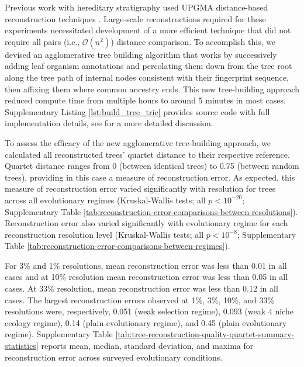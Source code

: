 Previous work with hereditary stratigraphy used UPGMA distance-based reconstruction techniques \citep{moreno2022hereditary}.
Large-scale reconstructions required for these experiments necessitated development of a more efficient technique that did not require all pairs (i.e., $\mathcal{O}(n^2)$) distance comparison.
To accomplish this, we devised an agglomerative tree building algorithm that works by successively adding leaf organism annotations and percolating them down from the tree root along the tree path of internal nodes consistent with their fingerprint sequence, then affixing them where common ancestry ends.
This new tree-building approach reduced compute time from multiple hours to around 5 minutes in most cases.
Supplementary Listing \ref{lst:build_tree_trie} provides source code with full implementation details, see \citep{moreno2024analysis} for a more detailed discussion.



To assess the efficacy of the new agglomerative tree-building approach, we calculated all reconstructed trees' quartet distance to their respective reference.
Quartet distance ranges from 0 (between identical trees) to 0.75 (between random trees), providing in this case a measure of reconstruction error.
As expected, this measure of reconstruction error varied significantly with resolution for trees across all evolutionary regimes (Kruskal-Wallis tests; all $p < 10^{-20}$; Supplementary Table \ref{tab:reconstruction-error-comparisons-between-resolutions}).
Reconstruction error also varied significantly with evolutionary regime for each reconstruction resolution level (Kruskal-Wallis tests; all $p < 10^{-8}$; Supplementary Table \ref{tab:reconstruction-error-comparisons-between-regimes}).

For 3\% and 1\% resolutions, mean reconstruction error was less than 0.01 in all cases and at 10\% resolution mean reconstruction error was less than 0.05 in all cases.
At 33\% resolution, mean reconstruction error was less than 0.12 in all cases.
The largest reconstruction errors observed at 1\%, 3\%, 10\%, and 33\% resolutions were, respectively, 0.051 (weak selection regime), 0.093 (weak 4 niche ecology regime), 0.14 (plain evolutionary regime), and 0.45 (plain evolutionary regime).
Supplementary Table \ref{tab:tree-reconstruction-quality-quartet-summary-statistics} reports mean, median, standard deviation, and maxima for reconstruction error across surveyed evolutionary conditions.

